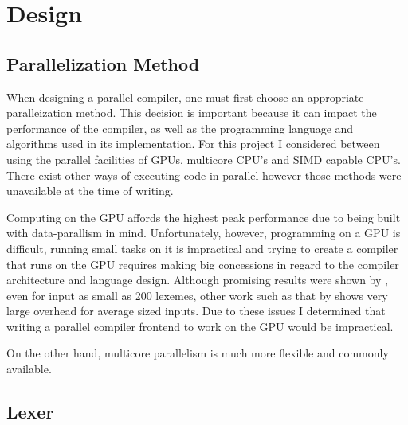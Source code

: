 \chapter{Design} \label{design}
\begin{comment}
\begin{itemize}
	\item Discuss the various approaches mentioned in the literature review, mentioning
		  their pros and cons. Write about the issues with designing a parallel compiler,
		  e.g issues common to all approaches. Elaborate on why tech choices are being
		  made e.g using rust. 
	\item Discuss my plan / design for the compiler.
\end{itemize}


\end{comment}

\section{Parallelization Method} \label{design_parallel_method}

When designing a parallel compiler, one must first choose an appropriate
paralleization method. This decision is important because it can impact the
performance of the compiler, as well as the programming language and algorithms
used in its implementation. For this project I considered between using the
parallel facilities of GPUs, multicore CPU's and SIMD capable CPU's. There exist
other ways of executing code in parallel however those methods were unavailable
at the time of writing.

Computing on the GPU affords the highest peak performance due to being built
with data-parallism in mind. Unfortunately, however, programming on a GPU is
difficult, running small tasks on it is impractical and trying to create a
compiler that runs on the GPU requires making big concessions in regard to the
compiler architecture and language design. Although promising results were shown
by \cite{skrzypczak_parallel_2012}, even for input as small as 200 lexemes,
other work such as that by \cite{voetter_compilation_2022} shows very large
overhead for average sized inputs. Due to these issues I determined that writing
a parallel compiler frontend to work on the GPU would be impractical.

On the other hand, multicore parallelism is much more flexible and commonly
available. 


\section{Lexer} \label{lexer}

